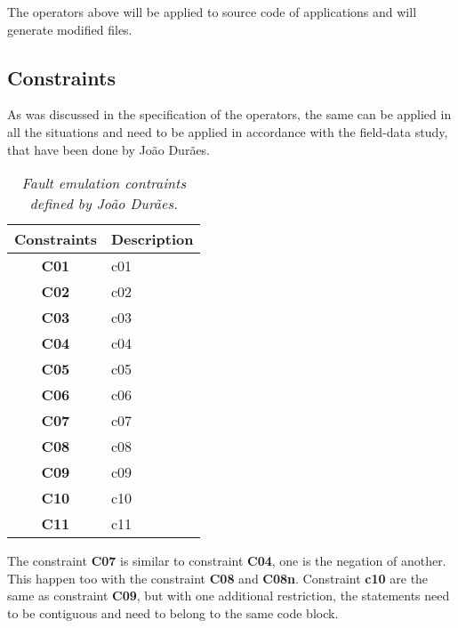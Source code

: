 The operators above will be applied to source code of applications and will generate modified files.

\clearpage
\subsection{Constraints}

As was discussed in the specification of the operators, the same can be applied in all the situations and need to be applied in accordance with the field-data study, that have been done by João Durães.

\begin{table}[!ht]
\centering
\begin{tabular}{|c|p{12cm}|}
\hline
\textbf{Constraints}            & \multicolumn{1}{c|}{\textbf{Description}}                                     \\ \hline \hline
\textbf{C01}         & \Acl{c01} \\ \hline
\textbf{C02}         & \Acl{c02} \\ \hline
\textbf{C03}         & \Acl{c03} \\ \hline
\textbf{C04}         & \Acl{c04} \\ \hline
\textbf{C05}         & \Acl{c05} \\ \hline
\textbf{C06}         & \Acl{c06} \\ \hline
\textbf{C07}         & \Acl{c07} \\ \hline
\textbf{C08}         & \Acl{c08} \\ \hline
\textbf{C09}         & \Acl{c09} \\ \hline
\textbf{C10}         & \Acl{c10} \\ \hline
\textbf{C11}         & \Acl{c11} \\ \hline
\end{tabular}
\caption{\small \sl Fault emulation contraints defined by João Durães.\label{tab:faultEmulationConstraintsDuraes}}
\end{table}

The constraint \textbf{C07} is similar to constraint \textbf{C04}, one is the negation of another. This happen too with the constraint \textbf{C08} and \textbf{C08n}.
Constraint \textbf{c10} are the same as constraint \textbf{C09}, but with one additional restriction, the statements need to be contiguous and need to belong to the same code block.

